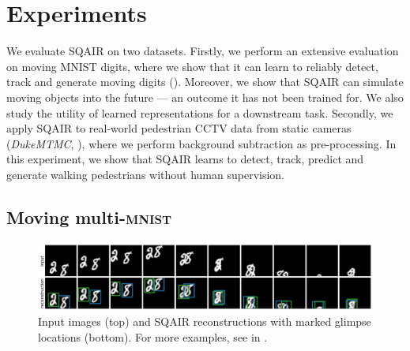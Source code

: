 \section{Experiments}
\label{sec:experiments}

We evaluate \gls{SQAIR} on two datasets.
Firstly, we perform an extensive evaluation on moving \gls{MNIST} digits, where we show that it can learn to reliably detect, track and generate moving digits (). Moreover, we show that \gls{SQAIR} can simulate moving objects into the future --- an outcome it has not been trained for. 
We also study the utility of learned representations for a downstream task.
Secondly, we apply \gls{SQAIR} to real-world pedestrian CCTV data from static cameras (\textit{DukeMTMC}, \cite{Ristani2016performance}), where we perform background subtraction as pre-processing. In this experiment, we show that \gls{SQAIR} learns to detect, track, predict and generate walking pedestrians without human supervision.

\subsection{Moving multi-\textsc{mnist}}
\label{sec:expr_mnist}

\begin{figure}
    \centering
    \includegraphics[width=\linewidth]{figures/SQAIR/mnist_rec/000106}
    \caption{Input images (top) and \gls{SQAIR} reconstructions with marked glimpse locations (bottom). For more examples, see  in .}
    \label{fig:mnist_recs}
\end{figure}

